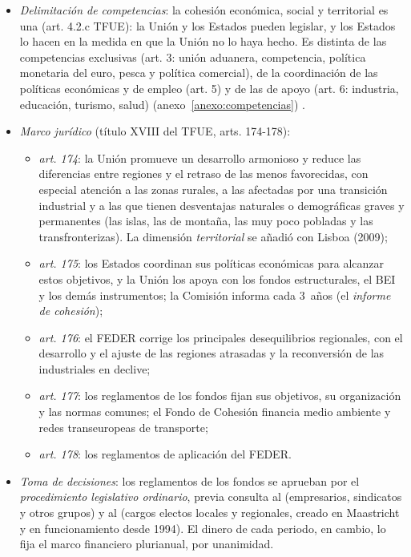 \documentclass[11pt]{article}
\begin{document}
\begin{itemize}
\item \emph{Delimitación de competencias}: la cohesión económica, social y territorial es una  (art. 4.2.c TFUE): la Unión y los Estados pueden legislar, y los Estados lo hacen en la medida en que la Unión no lo haya hecho. Es distinta de las competencias exclusivas (art. 3: unión aduanera, competencia, política monetaria del euro, pesca y política comercial), de la coordinación de las políticas económicas y de empleo (art. 5) y de las de apoyo (art. 6: industria, educación, turismo, salud)\nocite{UE2016TFUE} (anexo~\ref{anexo:competencias}) .
\item \emph{Marco jurídico} (título XVIII del TFUE, arts. 174-178):
  \begin{itemize}
  \item \emph{art. 174}: la Unión promueve un desarrollo armonioso y reduce las diferencias entre regiones y el retraso de las menos favorecidas, con especial atención a las zonas rurales, a las afectadas por una transición industrial y a las que tienen desventajas naturales o demográficas graves y permanentes (las islas, las de montaña, las muy poco pobladas y las transfronterizas). La dimensión \emph{territorial} se añadió con Lisboa (2009);
  \item \emph{art. 175}: los Estados coordinan sus políticas económicas para alcanzar estos objetivos, y la Unión los apoya con los fondos estructurales, el BEI y los demás instrumentos; la Comisión informa cada 3~años (el \emph{informe de cohesión});
  \item \emph{art. 176}: el FEDER corrige los principales desequilibrios regionales, con el desarrollo y el ajuste de las regiones atrasadas y la reconversión de las industriales en declive;
  \item \emph{art. 177}: los reglamentos de los fondos fijan sus objetivos, su organización y las normas comunes; el Fondo de Cohesión financia medio ambiente y redes transeuropeas de transporte;
  \item \emph{art. 178}: los reglamentos de aplicación del FEDER.
  \end{itemize}
\item \emph{Toma de decisiones}: los reglamentos de los fondos se aprueban por el \emph{procedimiento legislativo ordinario}, previa consulta al  (empresarios, sindicatos y otros grupos) y al  (cargos electos locales y regionales, creado en Maastricht y en funcionamiento desde 1994). El dinero de cada periodo, en cambio, lo fija el marco financiero plurianual, por unanimidad.
\end{itemize}
\end{document}
